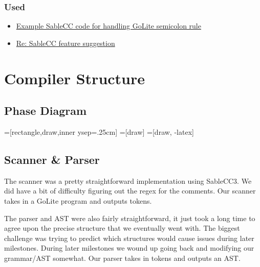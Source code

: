 \documentclass{article}
\begin{document}
\subsubsection{Used}
\begin{itemize}
\item \href{http://www.sable.mcgill.ca/~hendren/520/2016/semicolon-test/}{Example SableCC code for handling GoLite semicolon rule}
\item \href{http://lists.sablecc.org/pipermail/sablecc-discussion/msg00144.html}{Re: SableCC feature suggestion}
\end{itemize}
\section{Compiler Structure}

\subsection{Phase Diagram}

=[rectangle,draw,inner ysep=.25cm]
=[draw]
=[draw, -latex] 


\subsection{Scanner \& Parser}

The scanner was a pretty straightforward implementation using SableCC3. We did have a bit of difficulty figuring out the regex for the comments. Our scanner takes in a GoLite program and outputs tokens.

The parser and AST were also fairly straightforward, it just took a long time to agree upon the precise structure that we eventually went with. The biggest challenge was trying to predict which structures would cause issues during later milestones. During later milestones we wound up going back and modifying our grammar/AST somewhat. Our parser takes in tokens and outputs an AST.
\end{document}
